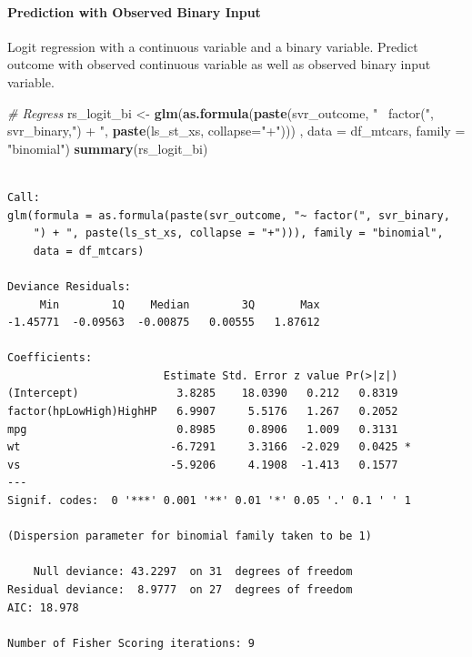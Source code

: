 \documentclass[
]{book}
\newenvironment{Shaded}{\begin{snugshade}}{\end{snugshade}}
\newcommand{\CommentTok}[1]{\textcolor[rgb]{0.56,0.35,0.01}{\textit{#1}}}
\newcommand{\DataTypeTok}[1]{\textcolor[rgb]{0.13,0.29,0.53}{#1}}
\newcommand{\KeywordTok}[1]{\textcolor[rgb]{0.13,0.29,0.53}{\textbf{#1}}}
\newcommand{\NormalTok}[1]{#1}
\newcommand{\OperatorTok}[1]{\textcolor[rgb]{0.81,0.36,0.00}{\textbf{#1}}}
\newcommand{\StringTok}[1]{\textcolor[rgb]{0.31,0.60,0.02}{#1}}
\begin{document}
\begin{Shaded}
\end{Shaded}

\hypertarget{prediction-with-observed-binary-input}{%
\paragraph{Prediction with Observed Binary Input}\label{prediction-with-observed-binary-input}}

Logit regression with a continuous variable and a binary variable. Predict outcome with observed continuous variable as well as observed binary input variable.

\begin{Shaded}
\begin{Highlighting}[]
\CommentTok{# Regress}
\NormalTok{rs_logit_bi <-}\StringTok{ }\KeywordTok{glm}\NormalTok{(}\KeywordTok{as.formula}\NormalTok{(}\KeywordTok{paste}\NormalTok{(svr_outcome,}
                                    \StringTok{"~ factor("}\NormalTok{, svr_binary,}\StringTok{") + "}\NormalTok{,}
                                    \KeywordTok{paste}\NormalTok{(ls_st_xs, }\DataTypeTok{collapse=}\StringTok{"+"}\NormalTok{)))}
\NormalTok{                   , }\DataTypeTok{data =}\NormalTok{ df_mtcars, }\DataTypeTok{family =} \StringTok{"binomial"}\NormalTok{)}
\KeywordTok{summary}\NormalTok{(rs_logit_bi)}
\end{Highlighting}
\end{Shaded}

\begin{verbatim}

Call:
glm(formula = as.formula(paste(svr_outcome, "~ factor(", svr_binary, 
    ") + ", paste(ls_st_xs, collapse = "+"))), family = "binomial", 
    data = df_mtcars)

Deviance Residuals: 
     Min        1Q    Median        3Q       Max  
-1.45771  -0.09563  -0.00875   0.00555   1.87612  

Coefficients:
                        Estimate Std. Error z value Pr(>|z|)  
(Intercept)               3.8285    18.0390   0.212   0.8319  
factor(hpLowHigh)HighHP   6.9907     5.5176   1.267   0.2052  
mpg                       0.8985     0.8906   1.009   0.3131  
wt                       -6.7291     3.3166  -2.029   0.0425 *
vs                       -5.9206     4.1908  -1.413   0.1577  
---
Signif. codes:  0 '***' 0.001 '**' 0.01 '*' 0.05 '.' 0.1 ' ' 1

(Dispersion parameter for binomial family taken to be 1)

    Null deviance: 43.2297  on 31  degrees of freedom
Residual deviance:  8.9777  on 27  degrees of freedom
AIC: 18.978

Number of Fisher Scoring iterations: 9
\end{verbatim}
\end{document}
